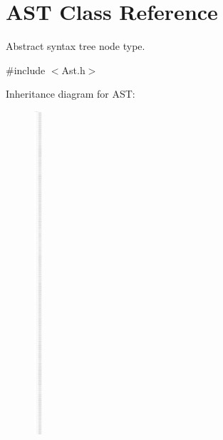 \hypertarget{classAST}{\section{A\-S\-T Class Reference}
\label{classAST}
}


Abstract syntax tree node type.  




{\ttfamily \#include $<$Ast.\-h$>$}

Inheritance diagram for A\-S\-T\-:\begin{figure}[H]
\begin{center}
\leavevmode
\includegraphics[height=12.000000cm]{classAST}
\end{center}
\end{figure}
